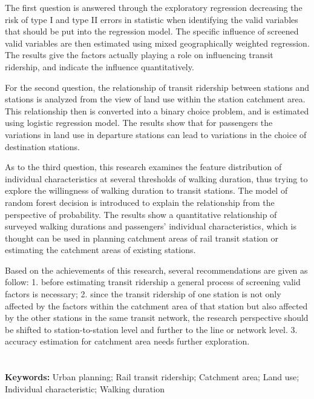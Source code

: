 \documentclass[12pt, twoside, a4paper]{book} %
\begin{document}
The first question is answered through the exploratory regression decreasing the risk of type I and type II errors in statistic when identifying the valid variables that should be put into the regression model. The specific influence of screened valid variables are then estimated using mixed geographically weighted regression. The results give the factors actually playing a role on influencing transit ridership, and indicate the influence quantitatively. 

For the second question, the relationship of transit ridership between stations and stations is analyzed from the view of land use within the station catchment area. This relationship then is converted into a binary choice problem, and is estimated using logistic regression model. The results show that for passengers the variations in land use in departure stations can lead to variations in the choice of destination stations.

As to the third question, this research examines the feature distribution of individual characteristics at several thresholds of walking duration, thus trying to explore the willingness of walking duration to transit stations. The model of random forest decision is introduced to explain the relationship from the perspective of probability. The results show a quantitative relationship of surveyed walking durations and passengers' individual characteristics, which is thought can be used in planning catchment areas of rail transit station or estimating the catchment areas of existing stations.

Based on the achievements of this research, several recommendations are given as follow: 1. before estimating transit ridership a general process of screening valid factors is necessary; 2. since the transit ridership of one station is not only affected by the factors within the catchment area of that station but also affected by the other stations in the same transit network, the research perspective should be shifted to station-to-station level and further to the line or network level. 3. accuracy estimation for catchment area needs further exploration. \\ \\ \\

\noindent %
\textbf{Keywords:} Urban planning; Rail transit ridership; Catchment area; Land use; Individual characteristic; Walking duration

\mainmatter %
\end{document}
